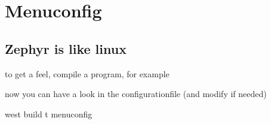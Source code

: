 \documentclass[letterpaper,10pt,english]{sphinxmanual}
\begin{document}
\chapter{Menuconfig}
\label{\detokenize{menuconfig:menuconfig}}\label{\detokenize{menuconfig::doc}}

\section{Zephyr is like linux}
\label{\detokenize{menuconfig:zephyr-is-like-linux}}

  to get a feel, compile a program, for example

\begin{sphinxVerbatim}[commandchars=\\\{\}]
\end{sphinxVerbatim}

now you can have a look in the configurationfile (and modify if needed)

\begin{sphinxVerbatim}[commandchars=\\\{\}]
 west build \PYGZhy{}t menuconfig
\end{sphinxVerbatim}
\end{document}
